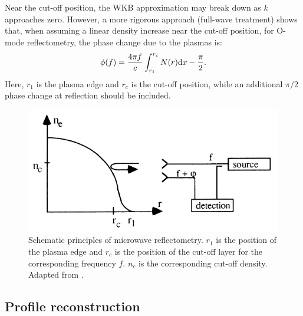 Near the cut-off position, the WKB approximation may break down as $k$ approaches zero. However, a more rigorous approach (full-wave treatment) shows that, when assuming a linear density increase near the cut-off position, for O-mode reflectometry, the phase change due to the plasmas is:%
\begin{equation}\label{eq:phase_shift}
  \phi(f)=\frac{4\pi{f}}{c}\int_{r_1}^{r_c}N(r)\mathrm{d} x - \frac{\pi}{2}.
\end{equation}
\noindent Here, $r_1$ is the plasma edge and $r_c$ is the cut-off position, while an additional $\pi/2$ phase change at reflection should be included.


\begin{figure}[h]
\begin{centering}
\includegraphics[scale=0.6]{reflec.png}
\par\end{centering}
\caption{Schematic principles of microwave reflectometry. $r_1$ is the position of the plasma edge and $r_c$  is the position of the cut-off layer for the corresponding frequency $f$. $n_c$ is the corresponding cut-off density. Adapted from \cite{Laviron_1996_PPCF}.}
\label{fig:reflec}
\end{figure}


\subsection{Profile reconstruction} \label{sec:density_profile_measurements}


